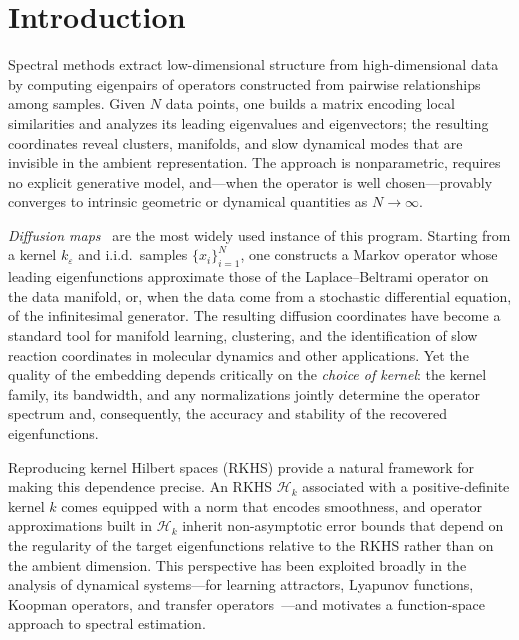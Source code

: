 \documentclass[11pt]{article}
\theoremstyle{remark}
\begin{document}
\section{Introduction}
\label{sec:intro}

Spectral methods extract low-dimensional structure from high-dimensional data by computing eigenpairs of operators constructed from pairwise relationships among samples.
Given $N$ data points, one builds a matrix encoding local similarities and analyzes its leading eigenvalues and eigenvectors; the resulting coordinates reveal clusters, manifolds, and slow dynamical modes that are invisible in the ambient representation.
The approach is nonparametric, requires no explicit generative model, and---when the operator is well chosen---provably converges to intrinsic geometric or dynamical quantities as $N\to\infty$.

\emph{Diffusion maps}~\citep{COIFMAN20065} are the most widely used instance of this program.
Starting from a kernel $k_\varepsilon$ and i.i.d.\ samples $\{x_i\}_{i=1}^N$, one constructs a Markov operator whose leading eigenfunctions approximate those of the Laplace--Beltrami operator on the data manifold, or, when the data come from a stochastic differential equation, of the infinitesimal generator.
The resulting diffusion coordinates have become a standard tool for manifold learning, clustering, and the identification of slow reaction coordinates in molecular dynamics and other applications.
Yet the quality of the embedding depends critically on the \emph{choice of kernel}: the kernel family, its bandwidth, and any normalizations jointly determine the operator spectrum and, consequently, the accuracy and stability of the recovered eigenfunctions.

Reproducing kernel Hilbert spaces (RKHS) provide a natural framework for making this dependence precise.
An RKHS $\mathcal{H}_k$ associated with a positive-definite kernel $k$ comes equipped with a norm that encodes smoothness, and operator approximations built in $\mathcal{H}_k$ inherit non-asymptotic error bounds that depend on the regularity of the target eigenfunctions relative to the RKHS rather than on the ambient dimension.
This perspective has been exploited broadly in the analysis of dynamical systems---for learning attractors, Lyapunov functions, Koopman operators, and transfer operators~\citep{CuckerandSmale, BH4, yk1, bhcm11, bhcm1, lyap_bh, bh_sparse_kfs, BHPhysicaD, hamzi2019kernel, bh2020b, SKO3, ALEXANDER2020132520, bh12, bh17, hb17, mmd_kernels_bh, hamzipaillet, jalalian_deds_2023, lee2024note, hamzi2025kernel_lions, bittracher2021dimensionality, bh_kfs_p6}---and motivates a function-space approach to spectral estimation.
\end{document}
